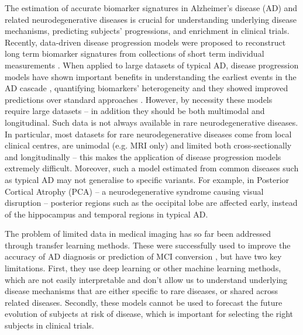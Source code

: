 \documentclass{llncs}
\begin{document}
The estimation of accurate biomarker signatures in Alzheimer's disease (AD) and related neurodegenerative diseases is crucial for understanding underlying disease mechanisms, predicting subjects' progressions, and enrichment in clinical trials. Recently, data-driven disease progression models were proposed to reconstruct long term biomarker signatures from collections of short term individual measurements \cite{oxtoby2018,jedynak2012computational}. When applied to large datasets of typical AD, disease progression models have shown important benefits in understanding the earliest events in the AD cascade \cite{oxtoby2018}, quantifying biomarkers' heterogeneity \cite{young2018uncovering} and they showed improved predictions over standard approaches \cite{oxtoby2018}. However, by necessity these models require large datasets -- in addition they should be both multimodal and longitudinal. Such data is not always available in rare neurodegenerative diseases. In particular, most datasets for rare neurodegenerative diseases come from local clinical centres, are unimodal (e.g. MRI only) and limited both cross-sectionally and longitudinally -- this makes the application of disease progression models extremely difficult.  Moreover, such a model estimated from common diseases such as typical AD may not generalise to specific variants. For example, in Posterior Cortical Atrophy (PCA) -- a neurodegenerative syndrome causing visual disruption -- posterior regions such as the occipital lobe are affected early, instead of the hippocampus and temporal regions in typical AD.

The problem of limited data in medical imaging has so far been addressed through transfer learning methods. These were successfully used to improve the accuracy of AD diagnosis \cite{hon2017towards} or prediction of MCI conversion \cite{cheng2015domain}, but have two key limitations. First, they use deep learning or other machine learning methods, which are not easily interpretable and don't allow us to understand underlying disease mechanisms that are either specific to rare diseases, or shared across related diseases. Secondly, these models cannot be used to forecast the future evolution of subjects at risk of disease, which is important for selecting the right subjects in clinical trials. 
\end{document}
